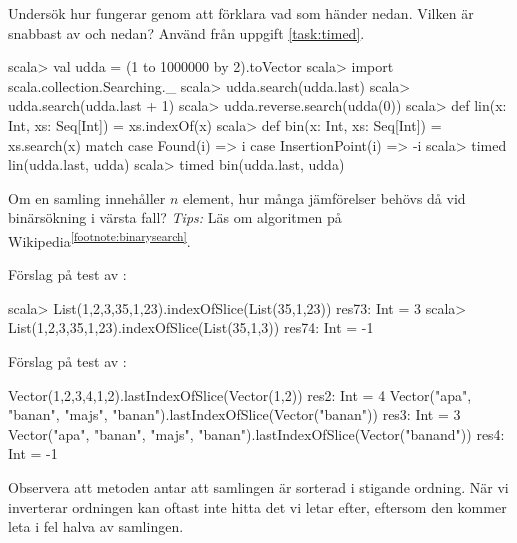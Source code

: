 Undersök hur  fungerar genom att förklara vad som händer nedan. Vilken är snabbast av  och  nedan? Använd  från uppgift \ref{task:timed}.

\begin{REPL}
scala> val udda = (1 to 1000000 by 2).toVector
scala> import scala.collection.Searching._
scala> udda.search(udda.last)
scala> udda.search(udda.last + 1)
scala> udda.reverse.search(udda(0))
scala> def lin(x: Int, xs: Seq[Int]) = xs.indexOf(x)
scala> def bin(x: Int, xs: Seq[Int]) = xs.search(x) match 
         case Found(i) => i
         case InsertionPoint(i) => -i
scala> timed{ lin(udda.last, udda) }
scala> timed{ bin(udda.last, udda) }
\end{REPL}

\Subtask Om en samling innehåller $n$ element, hur många jämförelser behövs då vid binärsökning i värsta fall? \emph{Tips:} Läs om algoritmen på Wikipedia\textsuperscript{\ref{footnote:binarysearch}}.


\SOLUTION


\TaskSolved \what


\SubtaskSolved
Förslag på test av :
\begin{REPLnonum}
scala> List(1,2,3,35,1,23).indexOfSlice(List(35,1,23))
res73: Int = 3
scala> List(1,2,3,35,1,23).indexOfSlice(List(35,1,3))
res74: Int = -1
\end{REPLnonum}

\SubtaskSolved
Förslag på test av :
\begin{REPLnonum}
Vector(1,2,3,4,1,2).lastIndexOfSlice(Vector(1,2))
res2: Int = 4
Vector("apa", "banan", "majs", "banan").lastIndexOfSlice(Vector("banan"))
res3: Int = 3
Vector("apa", "banan", "majs", "banan").lastIndexOfSlice(Vector("banand"))
res4: Int = -1
\end{REPLnonum}

\SubtaskSolved
Observera att metoden  antar att samlingen är sorterad i stigande ordning. När vi inverterar ordningen kan  oftast inte hitta det vi letar efter, eftersom den kommer leta i fel halva av samlingen.

